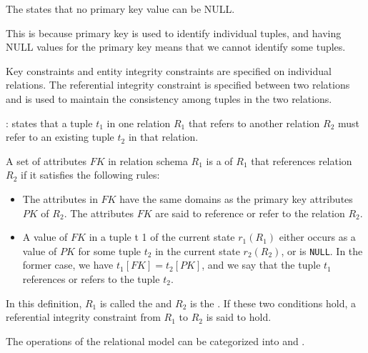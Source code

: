       \par The  states that no primary key value can be NULL.
      \par This is because primary key is used to identify individual tuples, and having NULL values for the primary key means that we cannot identify some tuples.

      \par Key constraints and entity integrity constraints are specified on individual relations.
The referential integrity constraint is specified between two relations and is used to
maintain the consistency among tuples in the two relations.
      \par {}:  states that a tuple $t_1$ in one relation $R_1$ that refers to another relation $R_2$ must refer to an existing tuple $t_2$ in that relation.


      \par A set of attributes $FK$ in relation schema $R_1$ is a  of $R_1$ that references relation $R_2$ if it satisfies the following rules:
      \begin{itemize}
        \item The attributes in $FK$ have the same domains as the primary key attributes $PK$ of $R_2$. The attributes $FK$ are said to reference or refer to the relation $R_2$.
        \item A value of $FK$ in a tuple t 1 of the current state $r_1(R_1)$ either occurs as a value of $PK$ for some tuple $t_2$ in the current state $r_2(R_2)$, or is \lstinline{NULL}. In the former case, we have $t_1[FK] = t_2[PK]$, and we say that the tuple $t_1$ references or refers to the tuple $t_2$.
      \end{itemize}

      \par In this definition, $R_1$ is called the  and $R_2$ is the . If these two conditions hold, a referential integrity constraint from $R_1$ to $R_2$ is said to hold.


  \par The operations of the relational model can be categorized into  and .

